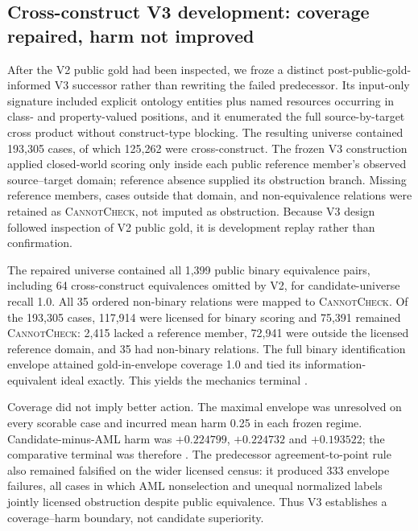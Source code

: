 \subsection{Cross-construct V3 development: coverage repaired, harm not improved}

After the V2 public gold had been inspected, we froze a distinct
post-public-gold-informed V3 successor rather than rewriting the failed
predecessor. Its input-only signature included explicit ontology entities plus
named resources occurring in class- and property-valued positions, and it
enumerated the full source-by-target cross product without construct-type
blocking. The resulting universe contained 193,305 cases, of which 125,262
were cross-construct. The frozen V3 construction applied closed-world scoring
only inside each public reference member's observed source--target domain;
reference absence supplied its obstruction branch. Missing reference
members, cases outside that domain, and non-equivalence relations were retained
as \textsc{CannotCheck}, not imputed as obstruction. Because V3 design followed
inspection of V2 public gold, it is development replay rather than
confirmation.

The repaired universe contained all 1,399 public binary equivalence pairs,
including 64 cross-construct equivalences omitted by V2, for candidate-universe
recall 1.0. All 35 ordered non-binary relations were mapped to
\textsc{CannotCheck}. Of the 193,305 cases, 117,914 were licensed for binary
scoring and 75,391 remained \textsc{CannotCheck}: 2,415 lacked a reference
member, 72,941 were outside the licensed reference domain, and 35 had
non-binary relations. The full binary identification envelope attained
gold-in-envelope coverage 1.0 and tied its information-equivalent ideal
exactly. This yields the mechanics terminal
.

Coverage did not imply better action. The maximal envelope was unresolved on
every scorable case and incurred mean harm 0.25 in each frozen regime.
Candidate-minus-AML harm was $+0.224799$, $+0.224732$ and $+0.193522$; the
comparative terminal was therefore
. The predecessor agreement-to-point rule
also remained falsified on the wider licensed census: it produced 333 envelope
failures, all cases in which AML nonselection and unequal normalized labels
jointly licensed obstruction despite public equivalence. Thus V3 establishes a
coverage--harm boundary, not candidate superiority.


